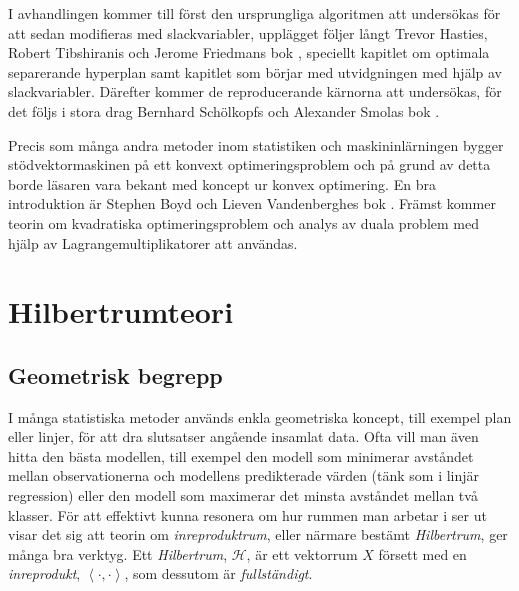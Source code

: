 \documentclass[a4paper, 12pt]{report}
\theoremstyle{definition}
\theoremstyle{remark}
\newcommand{\llangle}{\left\langle}
\newcommand{\rrangle}{\right\rangle}
\begin{document}

I avhandlingen kommer till först den ursprungliga algoritmen att undersökas för att sedan modifieras med slackvariabler, upplägget följer långt Trevor Hasties, Robert Tibshiranis och Jerome Friedmans bok \cite{ESL}, speciellt kapitlet om optimala separerande hyperplan samt kapitlet som börjar med utvidgningen med hjälp av slackvariabler.
Därefter kommer de reproducerande kärnorna att undersökas, för det följs i stora drag Bernhard Schölkopfs och Alexander Smolas bok \cite{LearningKernels}.

Precis som många andra metoder inom statistiken och maskininlärningen bygger stödvektormaskinen på ett konvext optimeringsproblem och på grund av detta borde läsaren vara bekant med koncept ur konvex optimering.
En bra introduktion är Stephen Boyd och Lieven Vandenberghes bok \cite{Boyd}.
Främst kommer teorin om kvadratiska optimeringsproblem och analys av duala problem med hjälp av Lagrangemultiplikatorer att användas.


\chapter{Hilbertrumteori}\label{chap:hilbert}

\section{Geometrisk begrepp}
I många statistiska metoder används enkla geometriska koncept, till exempel plan eller linjer, för att dra slutsatser angående insamlat data.
Ofta vill man även hitta den bästa modellen, till exempel den modell som minimerar avståndet mellan observationerna och modellens predikterade värden (tänk som i linjär regression) eller den modell som maximerar det minsta avståndet mellan två klasser.
För att effektivt kunna resonera om hur rummen man arbetar i ser ut visar det sig att teorin om \emph{inreproduktrum}, eller närmare bestämt \emph{Hilbertrum}, ger många bra verktyg.
Ett \emph{Hilbertrum}, $\mathcal{H}$, är ett vektorrum $X$ försett med en \emph{inreprodukt}, $\llangle \cdot, \cdot\rrangle$, som dessutom är \emph{fullständigt}.
\end{document}
